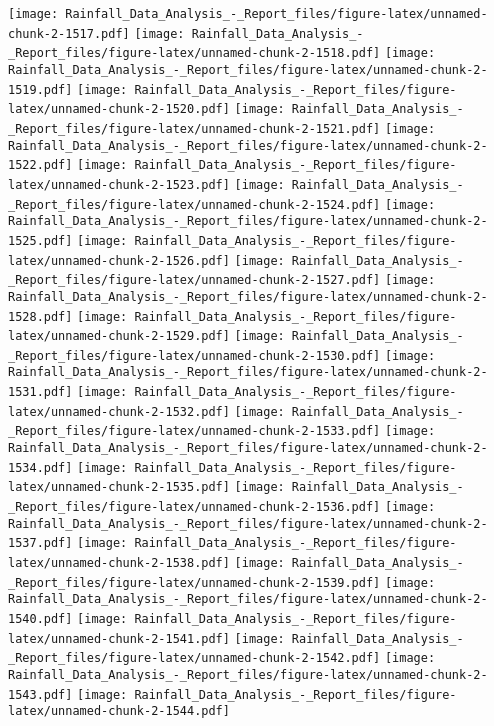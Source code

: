 \documentclass[
]{article}
\begin{document}
\texttt{[image: Rainfall\_Data\_Analysis\_-\_Report\_files/figure-latex/unnamed-chunk-2-1517.pdf]}
\texttt{[image: Rainfall\_Data\_Analysis\_-\_Report\_files/figure-latex/unnamed-chunk-2-1518.pdf]}
\texttt{[image: Rainfall\_Data\_Analysis\_-\_Report\_files/figure-latex/unnamed-chunk-2-1519.pdf]}
\texttt{[image: Rainfall\_Data\_Analysis\_-\_Report\_files/figure-latex/unnamed-chunk-2-1520.pdf]}
\texttt{[image: Rainfall\_Data\_Analysis\_-\_Report\_files/figure-latex/unnamed-chunk-2-1521.pdf]}
\texttt{[image: Rainfall\_Data\_Analysis\_-\_Report\_files/figure-latex/unnamed-chunk-2-1522.pdf]}
\texttt{[image: Rainfall\_Data\_Analysis\_-\_Report\_files/figure-latex/unnamed-chunk-2-1523.pdf]}
\texttt{[image: Rainfall\_Data\_Analysis\_-\_Report\_files/figure-latex/unnamed-chunk-2-1524.pdf]}
\texttt{[image: Rainfall\_Data\_Analysis\_-\_Report\_files/figure-latex/unnamed-chunk-2-1525.pdf]}
\texttt{[image: Rainfall\_Data\_Analysis\_-\_Report\_files/figure-latex/unnamed-chunk-2-1526.pdf]}
\texttt{[image: Rainfall\_Data\_Analysis\_-\_Report\_files/figure-latex/unnamed-chunk-2-1527.pdf]}
\texttt{[image: Rainfall\_Data\_Analysis\_-\_Report\_files/figure-latex/unnamed-chunk-2-1528.pdf]}
\texttt{[image: Rainfall\_Data\_Analysis\_-\_Report\_files/figure-latex/unnamed-chunk-2-1529.pdf]}
\texttt{[image: Rainfall\_Data\_Analysis\_-\_Report\_files/figure-latex/unnamed-chunk-2-1530.pdf]}
\texttt{[image: Rainfall\_Data\_Analysis\_-\_Report\_files/figure-latex/unnamed-chunk-2-1531.pdf]}
\texttt{[image: Rainfall\_Data\_Analysis\_-\_Report\_files/figure-latex/unnamed-chunk-2-1532.pdf]}
\texttt{[image: Rainfall\_Data\_Analysis\_-\_Report\_files/figure-latex/unnamed-chunk-2-1533.pdf]}
\texttt{[image: Rainfall\_Data\_Analysis\_-\_Report\_files/figure-latex/unnamed-chunk-2-1534.pdf]}
\texttt{[image: Rainfall\_Data\_Analysis\_-\_Report\_files/figure-latex/unnamed-chunk-2-1535.pdf]}
\texttt{[image: Rainfall\_Data\_Analysis\_-\_Report\_files/figure-latex/unnamed-chunk-2-1536.pdf]}
\texttt{[image: Rainfall\_Data\_Analysis\_-\_Report\_files/figure-latex/unnamed-chunk-2-1537.pdf]}
\texttt{[image: Rainfall\_Data\_Analysis\_-\_Report\_files/figure-latex/unnamed-chunk-2-1538.pdf]}
\texttt{[image: Rainfall\_Data\_Analysis\_-\_Report\_files/figure-latex/unnamed-chunk-2-1539.pdf]}
\texttt{[image: Rainfall\_Data\_Analysis\_-\_Report\_files/figure-latex/unnamed-chunk-2-1540.pdf]}
\texttt{[image: Rainfall\_Data\_Analysis\_-\_Report\_files/figure-latex/unnamed-chunk-2-1541.pdf]}
\texttt{[image: Rainfall\_Data\_Analysis\_-\_Report\_files/figure-latex/unnamed-chunk-2-1542.pdf]}
\texttt{[image: Rainfall\_Data\_Analysis\_-\_Report\_files/figure-latex/unnamed-chunk-2-1543.pdf]}
\texttt{[image: Rainfall\_Data\_Analysis\_-\_Report\_files/figure-latex/unnamed-chunk-2-1544.pdf]}
\end{document}
